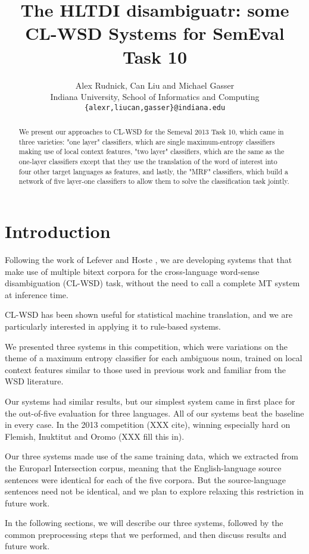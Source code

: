 \documentclass[11pt,letterpaper]{article}
\title{The HLTDI disambiguatr: some CL-WSD Systems for SemEval Task 10}
\author{Alex Rudnick, Can Liu and Michael Gasser\\
	    Indiana University, School of Informatics and Computing \\
	    {\tt \{alexr,liucan,gasser\}@indiana.edu}}
\date{}
\begin{document}
\maketitle

\begin{abstract}
We present our approaches to CL-WSD for the Semeval 2013 Task 10, which came in
three varieties: "one layer" classifiers, which are single maximum-entropy
classifiers making use of local context features, "two layer" classifiers,
which are the same as the one-layer classifiers except that they use the
translation of the word of interest into four other target languages as
features, and lastly, the "MRF" classifiers, which build a network of five
layer-one classifiers to allow them to solve the classification task jointly.
\end{abstract}

\section{Introduction}
Following the work of Lefever and Hoste
, we are developing systems
that that make use of multiple bitext corpora for the cross-language word-sense
disambiguation (CL-WSD) task, without the need to call a complete MT system at
inference time.

CL-WSD has been shown useful for statistical machine translation, and we are
particularly interested in applying it to rule-based systems.


We presented three systems in this competition, which were variations on the
theme of a maximum entropy classifier for each ambiguous noun, trained on local
context features similar to those used in previous work and familiar from the
WSD literature.


Our systems had similar results, but our simplest system came in first place
for the out-of-five evaluation for three languages. All of our systems beat the
baseline in every case.  In the 2013 competition (XXX cite), winning especially
hard on Flemish, Inuktitut and Oromo (XXX fill this in).


Our three systems made use of the same training data, which we extracted from
the Europarl Intersection corpus, meaning that the English-language source
sentences were identical for each of the five corpora. But the source-language
sentences need not be identical, and we plan to explore relaxing this
restriction in future work.


In the following sections, we will describe our three systems, followed by the
common preprocessing steps that we performed, and then discuss results and
future work.
\end{document}
